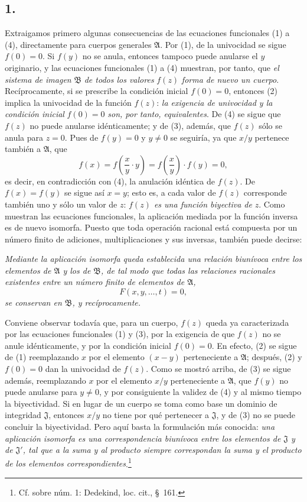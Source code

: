 \documentclass[11pt]{article}
\begin{document}
\subsection*{1.}

Extraigamos primero algunas consecuencias de las ecuaciones funcionales (1) a (4), directamente para cuerpos generales $\mathfrak A$. Por (1), de la univocidad se sigue $f(0)=0$. Si $f(y)$ no se anula, entonces tampoco puede anularse el $y$ originario, y las ecuaciones funcionales (1) a (4) muestran, por tanto, que \emph{el sistema de imagen} $\mathfrak B$ \emph{de todos los valores} $f(z)$ \emph{forma de nuevo un cuerpo}. Recíprocamente, si se prescribe la condición inicial $f(0)=0$, entonces (2) implica la univocidad de la función $f(z)$: \emph{la exigencia de univocidad y la condición inicial} $f(0)=0$ \emph{son, por tanto, equivalentes}. De (4) se sigue que $f(z)$ no puede anularse idénticamente; y de (3), además, que $f(z)$ sólo se anula para $z=0$. Pues de $f(y)=0$ y $y\ne0$ se seguiría, ya que $x/y$ pertenece también a $\mathfrak A$, que
\[
f(x)=f\!\left(\frac{x}{y}\cdot y\right)=f\!\left(\frac{x}{y}\right)\cdot f(y)=0,
\]
es decir, en contradicción con (4), la anulación idéntica de $f(z)$. De $f(x)=f(y)$ se sigue así $x=y$; esto es, a cada valor de $f(z)$ corresponde también uno y sólo un valor de $z$: \emph{$f(z)$ es una función biyectiva de} $z$. Como muestran las ecuaciones funcionales, la aplicación mediada por la función inversa es de nuevo isomorfa. Puesto que toda operación racional está compuesta por un número finito de adiciones, multiplicaciones y sus inversas, también puede decirse:

\emph{Mediante la aplicación isomorfa queda establecida una relación biunívoca entre los elementos de $\mathfrak A$ y los de $\mathfrak B$, de tal modo que todas las relaciones racionales existentes entre un número finito de elementos de $\mathfrak A$,
\[
F(x,y,\ldots,t)=0,
\]
se conservan en $\mathfrak B$, y recíprocamente.}

Conviene observar todavía que, para un cuerpo, $f(z)$ queda ya caracterizada por las ecuaciones funcionales (1) y (3), por la exigencia de que $f(z)$ no se anule idénticamente, y por la condición inicial $f(0)=0$. En efecto, (2) se sigue de (1) reemplazando $x$ por el elemento $(x-y)$ perteneciente a $\mathfrak A$; después, (2) y $f(0)=0$ dan la univocidad de $f(z)$. Como se mostró arriba, de (3) se sigue además, reemplazando $x$ por el elemento $x/y$ perteneciente a $\mathfrak A$, que $f(y)$ no puede anularse para $y\ne0$, y por consiguiente la validez de (4) y al mismo tiempo la biyectividad. Si en lugar de un cuerpo se toma como base un dominio de integridad $\mathfrak J$, entonces $x/y$ no tiene por qué pertenecer a $\mathfrak J$, y de (3) no se puede concluir la biyectividad. Pero aquí basta la formulación más conocida: \emph{una aplicación isomorfa es una correspondencia biunívoca entre los elementos de $\mathfrak J$ y de $\mathfrak J'$, tal que a la suma y al producto siempre correspondan la suma y el producto de los elementos correspondientes}.\footnote{Cf. sobre núm. 1: Dedekind, loc. cit., \S\ 161.}
\end{document}
